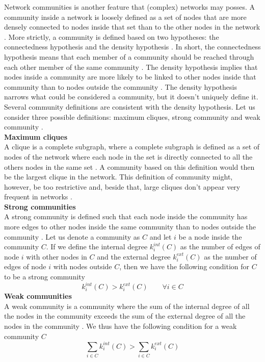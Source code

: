 \documentclass[11 pt , letterpaper , twoside , openright]{book}
\begin{document}
Network communities is another feature that (complex) networks may posses. A community inside a network is loosely defined as a set of nodes that are more densely connected to nodes inside that set than to the other nodes in the network \cite{Saha2015}. More strictly, a community is defined based on two hypotheses: the connectedness hypothesis and the density hypothesis \cite{Albert2016}. In short, the connectedness hypothesis means that each member of a community should be reached through each other member of the same community \cite{Albert2016}. The density hypothesis implies that nodes inside a community are more likely to be linked to other nodes inside that community than to nodes outside the community \cite{Albert2016}. The density hypothesis narrows what could be considered a community, but it doesn't uniquely define it. Several community definitions are consistent with the density hypothesis. Let us consider three possible definitions: maximum cliques, strong community and weak community \cite{Albert2016}.\\
\newline
\textbf{Maximum cliques}\\
\newline
A clique is a complete subgraph, where a complete subgraph is defined as a set of nodes of the network where each node in the set is directly connected to all the others nodes in the same set \cite{Albert2016}. A community based on this definition would then be the largest clique in the network. This definition of community might, however, be too restrictive and, beside that, large cliques don't appear very frequent in networks \cite{Albert2016}.\\   
\newline
\textbf{Strong communities}\\
\newline
A strong community is defined such that each node inside the community has more edges to other nodes inside the same community than to nodes outside the community \cite{Albert2016}. Let us denote a community as $C$ and let $i$ be a node inside the community $C$. If we define the internal degree $k_i^{int}(C)$ as the number of edges of node $i$ with other nodes in $C$ and the external degree $k_i^{ext}(C)$ as the number of edges of node $i$ with nodes outside $C$, then we have the following condition for $C$ to be a strong community \cite{Albert2016}
\begin{equation}
	k_i^{int}(C) > k_i^{ext}(C) \qquad \forall i \in C
\end{equation}
\newline
\textbf{Weak communities}\\
\newline
A weak community is a community where the sum of the internal degree of all the nodes in the community exceeds the sum of the external degree of all the nodes in the community \cite{Albert2016}. We thus have the following condition for a weak community $C$ \cite{Albert2016}
\begin{equation}
	\sum_{i \in C} k_i^{int}(C) > \sum_{i \in C}k_i^{ext}(C)
\end{equation}
\end{document}
